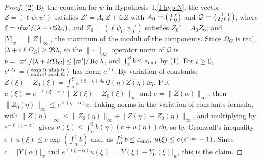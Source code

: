 \begin{proof}
(2) By the equation for $\psi$ in Hypothesis~I.\ref{I-hyp:N}, the vector
$Z=(\ell\psi,\psi')$ satisfies $Z'=A_0Z+\mathcal QZ$ with
$A_0=\begin{psmallmatrix}0&\ell\\ \ell&0\end{psmallmatrix}$ and
$\mathcal Q=\begin{psmallmatrix}0&0\\ \delta/\ell&0\end{psmallmatrix}$, where
$\delta=i\ell\varpi'/(\lambda+i\ell\Omega_G)$, and $Z_0=(\ell\psi_0,\psi_0')$ satisfies
$Z_0'=A_0Z_0$; and $|Y|_w=\|Z\|_\infty$, the maximum of the moduli of the
components. Since $\Omega_G$ is real, $|\lambda+i\ell\Omega_G|\ge\Re\lambda$, so
the $\|\cdot\|_\infty$ operator norm of $\mathcal Q$ is
$b=|\varpi'|/|\lambda+i\ell\Omega_G|\le|\varpi'|/\Re\lambda$, and
$\int_\alpha^\beta b\le\varepsilon_{\mathrm{end}}$ by (1). For $t\ge0$,
$e^{tA_0}=\begin{psmallmatrix}\cosh\ell t&\sinh\ell t\\ \sinh\ell t&\cosh\ell t\end{psmallmatrix}$
has norm $e^{\ell t}$. By variation of constants,
$Z(\xi)-Z_0(\xi)=\int_\alpha^\xi e^{(\xi-\eta)A_0}\mathcal Q(\eta)Z(\eta)\dd\eta$. Put
$u(\xi)=e^{-\ell(\xi-\alpha)}\|Z(\xi)-Z_0(\xi)\|_\infty$ and $c=\|Z(\alpha)\|_\infty$;
then $\|Z_0(\eta)\|_\infty\le e^{\ell(\eta-\alpha)}c$. Taking norms in the
variation of constants formula, with
$\|Z(\eta)\|_\infty\le\|Z_0(\eta)\|_\infty+\|Z(\eta)-Z_0(\eta)\|_\infty$, and multiplying
by $e^{-\ell(\xi-\alpha)}$ gives
$u(\xi)\le\int_\alpha^\xi b(\eta)(c+u(\eta))\dd\eta$, so by Gronwall's inequality
$c+u(\xi)\le c\exp(\int_\alpha^\xi b)$ and, as $\int_\alpha^\xi b\le\varepsilon_{\mathrm{end}}$,
$u(\xi)\le c\,(e^{\varepsilon_{\mathrm{end}}}-1)$. Since $c=|Y(\alpha)|_w$ and
$e^{\ell(\xi-\alpha)}u(\xi)=|Y(\xi)-Y_0(\xi)|_w$, this is the claim.
\end{proof}

